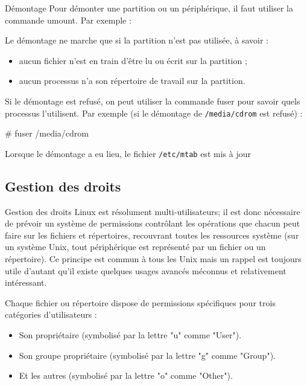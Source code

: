 \documentclass[10pt]{beamer}
\begin{document}
\begin{frame}[fragile]{Démontage}
Pour  démonter  une  partition  ou un  périphérique,  il faut  utiliser  la commande
\alert{umount}. 
Par exemple :
 

\pause

Le démontage ne marche que si la partition n'est pas utilisée, à savoir :
\begin{itemize} 
\item aucun fichier n'est en train d'être lu ou écrit sur la partition ; 
\item aucun processus n'a son répertoire de travail sur la partition. 
\end{itemize}
\pause
Si le démontage est refusé, on peut utiliser la commande fuser pour savoir quels
processus l'utilisent. Par exemple (si le démontage de \texttt{/media/cdrom} est refusé) :

\# \alert{fuser /media/cdrom} 

Lorsque le démontage a eu lieu, le fichier \texttt{/etc/mtab} est mis à jour
\end{frame}

\subsection{Gestion des droits}
\begin{frame}{Gestion des droits}
Linux est résolument multi-utilisateurs; il est donc nécessaire de prévoir un système de permissions contrôlant les opérations que chacun peut faire sur les fichiers et répertoires, recouvrant toutes les ressources système (sur un système Unix, tout périphérique est représenté par un fichier ou un répertoire). Ce principe est commun à tous les Unix mais un rappel est toujours utile d'autant qu'il existe quelques usages avancés méconnus et relativement intéressant.

Chaque fichier ou répertoire dispose de permissions spécifiques pour trois catégories d'utilisateurs :

\begin{itemize}
\item Son propriétaire (symbolisé par la lettre "\alert{u}" comme "\alert{User}").
\item Son groupe propriétaire (symbolisé par la lettre "\alert{g}" comme "\alert{Group}").
\item Et les autres (symbolisé par la lettre "\alert{o}" comme "\alert{Other}").
\end{itemize}
\end{frame}
\end{document}
